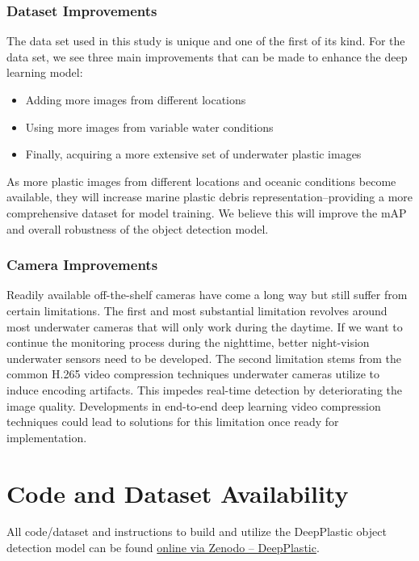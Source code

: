 \documentclass[a4paper,fleqn]{cas-dc}
\begin{document}
\subsubsection{Dataset Improvements}
The data set used in this study is unique and one of the first of its kind. For the data set, we see three main improvements that can be made to enhance the deep learning model:

\begin{itemize}
    \item Adding more images from different locations
    \item Using more images from variable water conditions
    \item Finally, acquiring a more extensive set of underwater plastic images
\end{itemize}

As more plastic images from different locations and oceanic conditions become available, they will increase marine plastic debris representation–providing a more comprehensive dataset for model training. We believe this will improve the mAP and overall robustness of the object detection model.

\subsubsection{Camera Improvements}
Readily available off-the-shelf cameras have come a long way but still suffer from certain limitations.
The first and most substantial limitation revolves around most underwater cameras that will only work during the daytime. If we want to continue the monitoring process during the nighttime, better night-vision underwater sensors need to be developed.
The second limitation stems from the common H.265 video compression techniques \cite{Lu_2019_CVPR} underwater cameras utilize to induce encoding artifacts. This impedes real-time detection by deteriorating the image quality. Developments in end-to-end deep learning video compression techniques \cite{Lu_2019_CVPR} could lead to solutions for this limitation once ready for implementation.




\section{Code and Dataset Availability}

All code/dataset and instructions to build and utilize the DeepPlastic object detection model can be found \href{https://zenodo.org/record/5562940#.YWSe39nMI-S}{ online via Zenodo -- DeepPlastic}.
\indent
\end{document}
